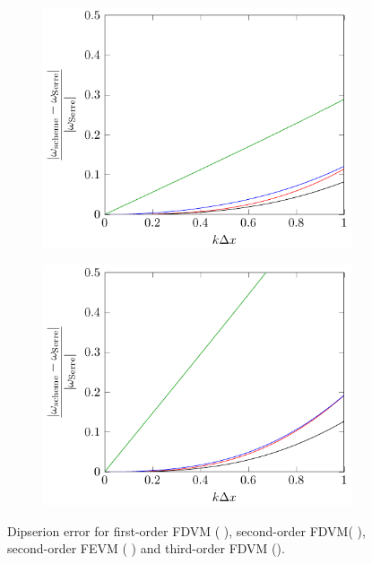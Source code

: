\begin{figure}
	\centering
	\begin{subfigure}{0.5\textwidth}
		\includegraphics[width=\textwidth]{./chp5/figures/DispRelkh0p5.pdf}
	\end{subfigure}%
	\begin{subfigure}{0.5\textwidth}
		\includegraphics[width=\textwidth]{./chp5/figures/DispRelkh2p5.pdf}
	\end{subfigure}
	\caption{Dipserion error for first-order FDVM ({\color{green!60!black} \solidrule}), second-order FDVM({\color{red} \solidrule}), second-order FEVM ({\color{blue} \solidrule})  and third-order FDVM ({\solidrule}).}
	\label{fig:DispErrMeth1}
\end{figure}

